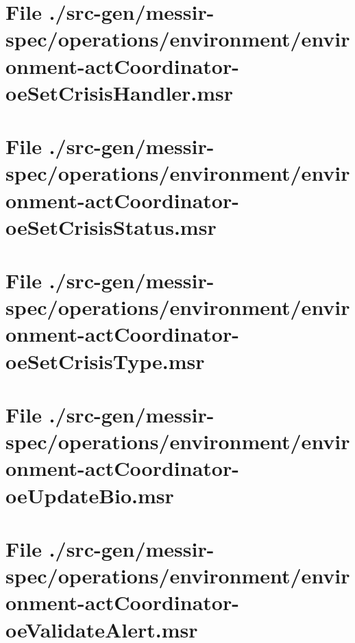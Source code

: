 \section[File /src-gen/messir-spec.../environment-actCoordinator-oeSetCrisisHandler.msr]{File ./src-gen/messir-spec/operations/environment/environment-actCoordinator-oeSetCrisisHandler.msr}
\scriptsize

\normalsize
	
\section[File /src-gen/messir-spec.../environment-actCoordinator-oeSetCrisisStatus.msr]{File ./src-gen/messir-spec/operations/environment/environment-actCoordinator-oeSetCrisisStatus.msr}
\scriptsize

\normalsize
	
\section[File /src-gen/messir-spec.../environment-actCoordinator-oeSetCrisisType.msr]{File ./src-gen/messir-spec/operations/environment/environment-actCoordinator-oeSetCrisisType.msr}
\scriptsize

\normalsize
	
\section[File /src-gen/messir-spec.../environment-actCoordinator-oeUpdateBio.msr]{File ./src-gen/messir-spec/operations/environment/environment-actCoordinator-oeUpdateBio.msr}
\scriptsize

\normalsize
	
\section[File /src-gen/messir-spec.../environment-actCoordinator-oeValidateAlert.msr]{File ./src-gen/messir-spec/operations/environment/environment-actCoordinator-oeValidateAlert.msr}
\scriptsize

\normalsize
	
